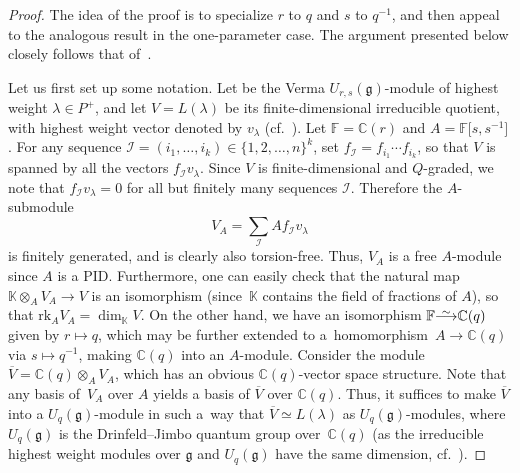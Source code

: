 \documentclass[10pt,a4paper]{amsart}
\numberwithin{equation}{section}
\newcommand{\fg}{\mathfrak{g}}
\newcommand{\BC}{\mathbb{C}}
\newcommand{\uu}{U_{r,s}(\fg)}
\newcommand{\II}{\mathcal{I}}
\newcommand\iso{ \vphantom{j^{X^2}}\smash{\overset{\sim}{\vphantom{\rule{0pt}{0.20em}}\smash{\longrightarrow}}} }
\begin{document}
\begin{proof}
The idea of the proof is to specialize $r$ to $q$ and $s$ to $q^{-1}$, and then appeal to the analogous result in the one-parameter case. The argument presented below closely follows that of~\cite[Sections~5.12--5.15]{J}.

Let us first set up some notation. Let  be the Verma $\uu$-module of highest weight $\lambda\in P^+$, and let $V = L(\lambda)$ be its finite-dimensional irreducible quotient, with highest weight vector denoted by $v_\lambda$ (cf.\ \cite{BW2,BGH2}). Let $\mathbb{F}=\BC(r)$ and $A = \mathbb{F}\bigl[s,s^{-1}\bigr]$. For any sequence $\II = (i_{1},\dots ,i_{k})\in \{1, 2, \dots, n\}^k$, set $f_{\II} = f_{i_{1}} \cdots f_{i_{k}}$, so that $V$ is spanned by all the vectors $f_{\II}v_{\lambda}$. Since $V$ is finite-dimensional and $Q$-graded, we note that $f_{\II}v_{\lambda} = 0$ for all but finitely many sequences $\II$. Therefore the $A$-submodule
\[
 V_{A} = \sum_{\II} A f_{\II}v_{\lambda}
\]
is finitely generated, and is clearly also torsion-free. Thus, $V_{A}$ is a free $A$-module since $A$ is a PID. Furthermore, one can easily check that the natural map $\mathbb{K} \otimes_{A} V_{A} \to V$ is an isomorphism (since~$\mathbb{K}$ contains the field of fractions of $A$), so that $\mathrm{rk}_A{V_A}=\dim_{\mathbb{K}}{V}$.
On the other hand, we have an isomorphism $\mathbb{F} \iso \mathbb{C}(q)$ given by $r \mapsto q$, which may be further extended to a~homomorphism~${A \to \mathbb{C}(q)}$ via $s \mapsto q^{-1}$, making $\mathbb{C}(q)$ into an $A$-module. Consider the module $\overline{V} = \mathbb{C}(q) \otimes_{A} V_{A}$, which has an obvious $\mathbb{C}(q)$-vector space structure. Note that any basis of~$V_{A}$ over $A$ yields a basis of $\overline{V}$ over $\mathbb{C}(q)$. Thus, it suffices to make $\overline{V}$ into a $U_{q}(\mathfrak{g})$-module in such a~way that $\overline{V} \simeq L(\lambda)$ as $U_{q}(\mathfrak{g})$-modules, where $U_{q}(\mathfrak{g})$ is the Drinfeld--Jimbo quantum group over~$\mathbb{C}(q)$ (as the irreducible highest weight modules over $\fg$ and $U_q(\fg)$ have the same dimension, cf.~\cite[Theorem~5.15]{J}).


\end{proof}
\end{document}
